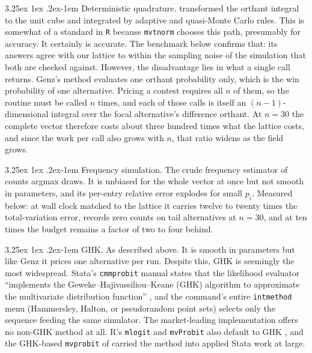 \documentclass[11pt]{article}
\makeatletter
\renewcommand\paragraph{\@startsection{paragraph}{4}{\z@}%
  {3.25ex \@plus1ex \@minus.2ex}{-1em}%
  {\normalfont\normalsize\itshape}}
\makeatother
\begin{document}
\paragraph{Deterministic quadrature.} \citet{genz1992} transformed the orthant
integral to the unit cube and integrated by adaptive and quasi-Monte Carlo rules.
This is somewhat of a standard in \texttt{R} because \texttt{mvtnorm} chooses this path, presumably for accuracy. It certainly is accurate. The benchmark below confirms that: its answers agree with our lattice to within the sampling noise of the simulation that both are checked against. However, the disadvantage lies in what a single call returns. Genz's method evaluates one orthant probability only, which is the win probability of one alternative. Pricing a contest
requires all $n$ of them, so the routine must be called $n$ times, and each of
those calls is itself an $(n-1)$-dimensional integral over the focal
alternative's difference orthant. At $n=30$ the complete vector therefore
costs about three hundred times what the lattice costs, and since the work per
call also grows with $n$, that ratio widens as the field grows.

\paragraph{Frequency simulation.} The crude frequency estimator of
\citet{lerman1981} counts argmax draws. It is unbiased for the whole vector at
once but not smooth in parameters, and its per-entry relative error explodes for
small $p_i$. Measured below: at wall clock matched to the lattice it carries
twelve to twenty times the total-variation error, records zero counts on tail
alternatives at $n=30$, and at ten times the budget remains a factor of two to
four behind.

\paragraph{GHK.} As described above. It is smooth in parameters but like Genz it prices one alternative per run. Despite this, GHK is seemingly the most widespread. Stata's \texttt{cmmprobit} manual states that the likelihood evaluator ``implements the Geweke--Hajivassiliou--Keane (GHK) algorithm to approximate the multivariate distribution function''
\citep{statacorp2023,gates2006}, and the command's entire
\texttt{intmethod} menu (Hammersley, Halton, or pseudorandom point
sets) selects only the sequence feeding the same simulator. The
market-leading implementation offers no non-GHK method at all. R's
\texttt{mlogit} and \texttt{mvProbit} also default to GHK
\citep{croissant2020}, and the GHK-based \texttt{mvprobit} of
\citet{cappellari2003} carried the method into applied Stata work at
large.
\end{document}
